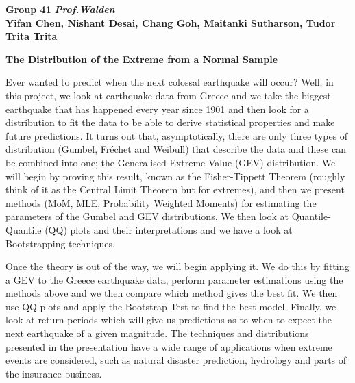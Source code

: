 \documentclass{article}
\begin{document}
\noindent
\LARGE{\textbf{Group 41}}
\hfill
\normalsize
\textit{\textbf{Prof.Walden}}\\
\textbf{Yifan Chen, Nishant Desai, Chang Goh, Maitanki Sutharson, Tudor Trita Trita}

\begin{center}
    \LARGE{\textbf{The Distribution of the Extreme from a Normal Sample}}
\end{center}

Ever wanted to predict when the next colossal earthquake will occur? Well, in this project, we look at earthquake data from Greece and we take the biggest earthquake that has happened every year since 1901 and then look for a distribution to fit the data to be able to derive statistical properties and make future predictions. It turns out that, asymptotically, there are only three types of distribution (Gumbel, Fr\'{e}chet and Weibull) that describe the data and these can be combined into one; the Generalised Extreme Value (GEV) distribution. We will begin by proving this result, known as the Fisher-Tippett Theorem (roughly think of it as the Central Limit Theorem but for extremes), and then we present methods (MoM, MLE, Probability Weighted Moments) for estimating the parameters of the Gumbel and GEV distributions. We then look at Quantile-Quantile (QQ) plots and their interpretations and we have a look at Bootstrapping techniques.

Once the theory is out of the way, we will begin applying it. We do this by fitting a GEV to the Greece earthquake data, perform parameter estimations using the methods above and we then compare which method gives the best fit. We then use QQ plots and apply the Bootstrap Test to find the best model. Finally, we look at return periods which will give us predictions as to when to expect the next earthquake of a given magnitude. The techniques and distributions presented in the presentation have a wide range of applications when extreme events are considered, such as natural disaster prediction, hydrology and parts of the insurance business.
\end{document}
